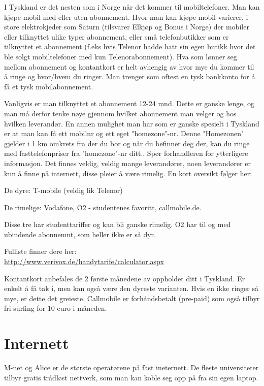 I Tyskland er det nesten som i Norge når det kommer til mobiltelefoner. Man kan kjøpe mobil med eller uten abonnement. Hvor man kan kjøpe mobil varierer, i store elektrokjeder som Saturn (tilsvarer Elkjøp og Bonus i Norge) der mobiler eller tilknyttet ulike typer abonnement, eller små telefonbutikker som er tilknyttet et abonnement (f.eks hvis Telenor hadde hatt sin egen butikk hvor det ble solgt mobiltelefoner med kun Telenorabonnement).
Hva som lønner seg mellom abonnement og kontantkort er helt avhengig av hvor mye du kommer til å ringe og hvor/hvem du ringer.
Man trenger som oftest en tysk bankkonto for å få et tysk mobilabonnement.

Vanligvis er man tilknyttet et abonnement 12-24 mnd. Dette er ganske lenge, og man må derfor tenke nøye gjennom hvilket abonnement man velger og hos hvilken leverandør.
En annen mulighet man har som er ganske spesielt i Tyskland er at man kan få ett mobilnr og ett eget "homezone"-nr. Denne "Homezonen" gjelder i 1 km omkrets fra der du bor og når du befinner deg der, kan du ringe med fasttelefonpriser fra "homezone"-nr ditt.. Spør forhandleren for ytterligere informasjon.
Det finnes veldig, veldig mange leverandører, noen leverandører er kun å finne på internett, disse pleier å være rimelig. En kort oversikt følger her:

De dyre: T-mobile (veldig lik Telenor)
 
De rimelige: Vodafone, O2 - studentenes favoritt,  callmobile.de. 

Disse tre har studenttariffer og kan bli ganske rimelig. O2 har til og med ubindende abonnemnt, som heller ikke er så dyr.
 
Fulliste finner dere her:\\
\url{http://www.verivox.de/handytarife/calculator.aspx}
 

Kontantkort anbefales de 2 første månedene av oppholdet ditt i Tyskland.
Er enkelt å få tak i, men kan også være den dyreste varianten. Hvis en ikke ringer så mye, er dette det greieste. Callmobile er forhåndsbetalt (pre-paid) som også tilbyr fri surfing for 10 euro i måneden.



\section{Internett}

M-net og Alice er de største operatørene på fast ineternett. De fleste universiteter tilbyr gratis trådløst nettverk, som man kan koble seg opp på fra sin egen laptop.


